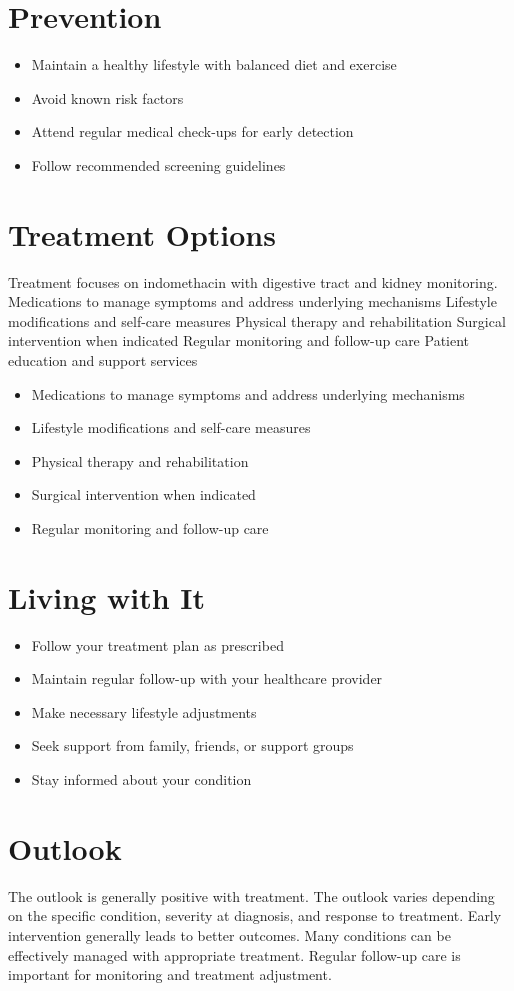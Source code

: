 \section{Prevention}
\begin{itemize}[noitemsep]
  \item Maintain a healthy lifestyle with balanced diet and exercise
  \item Avoid known risk factors
  \item Attend regular medical check-ups for early detection
  \item Follow recommended screening guidelines
\end{itemize}
\section{Treatment Options}
Treatment focuses on indomethacin with digestive tract and kidney monitoring. Medications to manage symptoms and address underlying mechanisms Lifestyle modifications and self-care measures Physical therapy and rehabilitation Surgical intervention when indicated Regular monitoring and follow-up care Patient education and support services

\begin{itemize}[noitemsep]
  \item Medications to manage symptoms and address underlying mechanisms
  \item Lifestyle modifications and self-care measures
  \item Physical therapy and rehabilitation
  \item Surgical intervention when indicated
  \item Regular monitoring and follow-up care
\end{itemize}
\section{Living with It}
\begin{itemize}[noitemsep]
  \item Follow your treatment plan as prescribed
  \item Maintain regular follow-up with your healthcare provider
  \item Make necessary lifestyle adjustments
  \item Seek support from family, friends, or support groups
  \item Stay informed about your condition
\end{itemize}
\section{Outlook}
The outlook is generally positive with treatment. The outlook varies depending on the specific condition, severity at diagnosis, and response to treatment. Early intervention generally leads to better outcomes. Many conditions can be effectively managed with appropriate treatment. Regular follow-up care is important for monitoring and treatment adjustment.
